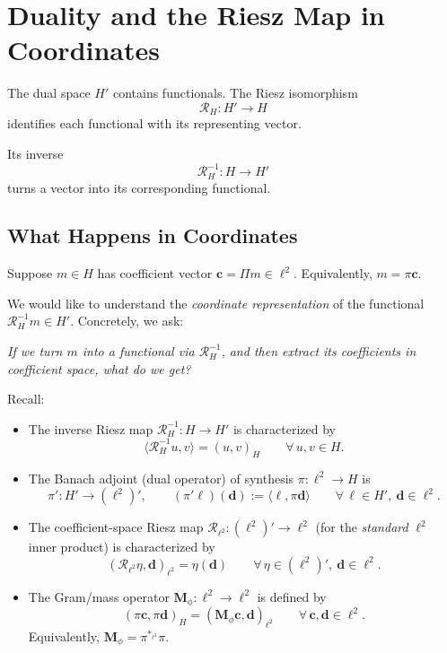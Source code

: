 \documentclass[11pt,twoside,openright]{book}
\theoremstyle{plain}
\theoremstyle{definition}
\theoremstyle{remark}
\newcommand{\Riesz}{\mathcal{R}}
\begin{document}
\section{Duality and the Riesz Map in Coordinates}

The dual space $H'$ contains functionals.
The Riesz isomorphism
\[
\Riesz_H : H' \to H
\]
identifies each functional with its representing vector.

Its inverse
\[
\Riesz_H^{-1} : H \to H'
\]
turns a vector into its corresponding functional.

\subsection{What Happens in Coordinates}
\label{ssec:riesz-in-coordinates}

Suppose $m \in H$ has coefficient vector $\mathbf{c} = \Pi m \in \ell^2$.
Equivalently, $m = \pi \mathbf{c}$.

We would like to understand the \emph{coordinate representation} of the
functional $\Riesz_H^{-1} m \in H'$.  Concretely, we ask:

\medskip
\emph{If we turn $m$ into a functional via $\Riesz_H^{-1}$, and then extract
its coefficients in coefficient space, what do we get?}
\medskip

Recall:
\begin{itemize}
\item The inverse Riesz map $\Riesz_H^{-1}:H\to H'$ is characterized by
\begin{equation}
\label{eq:riesz-inv-def}
\langle \Riesz_H^{-1} u, v\rangle = (u,v)_H
\qquad \forall\, u,v\in H.
\end{equation}

\item The Banach adjoint (dual operator) of synthesis $\pi:\ell^2\to H$ is
\begin{equation}
\label{eq:pi-prime-def}
\pi' : H' \to (\ell^2)', \qquad
(\pi' \ell)(\mathbf{d}) := \langle \ell, \pi \mathbf{d}\rangle
\qquad \forall\,\ell\in H',\ \mathbf{d}\in \ell^2.
\end{equation}

\item The coefficient-space Riesz map $\Riesz_{\ell^2}:(\ell^2)'\to \ell^2$
(for the \emph{standard} $\ell^2$ inner product) is characterized by
\begin{equation}
\label{eq:riesz-l2-def}
(\Riesz_{\ell^2}\eta,\mathbf{d})_{\ell^2} = \eta(\mathbf{d})
\qquad \forall\,\eta\in(\ell^2)',\ \mathbf{d}\in\ell^2.
\end{equation}

\item The Gram/mass operator $\mathbf{M}_\phi:\ell^2\to\ell^2$ is defined by
\begin{equation}
\label{eq:gram-def-here}
(\pi \mathbf{c},\pi \mathbf{d})_H = (\mathbf{M}_\phi \mathbf{c},\mathbf{d})_{\ell^2}
\qquad \forall\,\mathbf{c},\mathbf{d}\in\ell^2.
\end{equation}
Equivalently, $\mathbf{M}_\phi=\pi^{*_{\ell^2}}\pi$.
\end{itemize}
\end{document}
